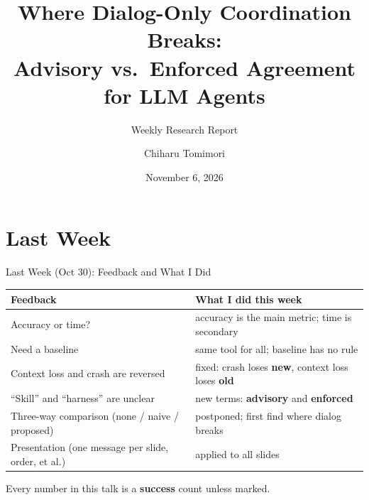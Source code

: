 \documentclass[aspectratio=169,11pt]{beamer}
\title[Advisory vs.\ Enforced Agreement]{Where Dialog-Only Coordination Breaks:\\Advisory vs.\ Enforced Agreement for LLM Agents}
\subtitle{Weekly Research Report}
\author{Chiharu Tomimori}
\institute{Institute of Science Tokyo}
\date{November 6, 2026}
\begin{document}
\begin{frame}
  \titlepage
\end{frame}

\section{Last Week}
\begin{frame}{Last Week (Oct 30): Feedback and What I Did}
  \small
  \begin{tabular}{p{6.6cm}p{6.6cm}}
    \toprule
    Feedback & What I did this week \\
    \midrule
    Accuracy or time? & accuracy is the main metric; time is secondary \\
    \leavevmode\pause Need a baseline & same tool for all; baseline has no rule \\
    \leavevmode\pause Context loss and crash are reversed & fixed: crash loses \textbf{new}, context loss loses \textbf{old} \\
    \leavevmode\pause ``Skill'' and ``harness'' are unclear & new terms: \textbf{advisory} and \textbf{enforced} \\
    \leavevmode\pause Three-way comparison (none / naive / proposed) & postponed; first find where dialog breaks \\
    \leavevmode\pause Presentation (one message per slide, order, et al.) & applied to all slides \\
    \bottomrule
  \end{tabular}

  \vspace{0.5em}
  \pause\footnotesize Every number in this talk is a \textbf{success} count unless marked.
\end{frame}


\end{document}
